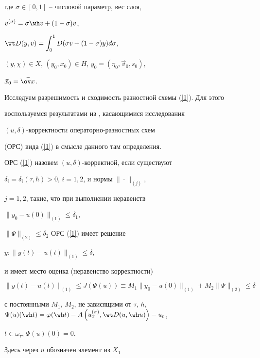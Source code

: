 где $\sigma \in [0,1]$ -- числовой параметр, вес слоя, 


$v^{(\sigma)}=\sigma \wh v+(1-\sigma) v$,


$\wt D(y,v)=\displaystyle\int_0^1 D(\sigma v+(1-\sigma) y) d\sigma$,


$(y,\chi) \in X$, $(y_0,x_0) \in H$, $ y_0=(\eta_0,\Vec v_0,s_0)$, 


$\Vec x_0=\Vec {\ov x}$.





Исследуем разрешимость и сходимость разностной схемы (\ref{1}). Для этого 


воспользуемся результатами из \cite{F}, касающимися исследования 


$(u,\delta)$-корректности операторно-разностных схем


(ОРС) вида (\ref{1}) в смысле данного там определения.





\begin{defnnonum}


ОРС (\ref{1}) назовем $(u,\delta)$-корректной, если существуют


$\delta_i=\delta_i(\tau,h)>0$, $i=1,2$, и нормы $\|\cdot\|_{(j)}$,


$j=1,2$, такие, что при выполнении неравенств


$\|y_0-u(0)\|_{(1)}\le \delta_1$,


$\|\Psi\|_{(2)}\le \delta_2$ ОРС (\ref{1}) имеет решение


$y:\|y(t)-u(t)\|_{(1)}\le \delta$,


и имеет место оценка (неравенство корректности)


$$


\|y(t)-u(t)\|_{(1)}\le J(\Psi(u))\equiv


M_1\|y_0-u(0)\|_{(1)}+M_2\|\Psi\|_{(2)}\le \delta


$$


с постоянными $M_1$, $M_2$, не зависящими от $\tau$, $h$, $\Psi(u)(\wh t)=


\varphi(\wh t)-A\left(u_x^{(\sigma)},\wt D(u,\wh u)\right)-u_t$,


$t\in \omega_\tau$, $\Psi(u)(0)=0$.


\end{defnnonum}





Здесь через $u$ обозначен элемент из $X_1$  


